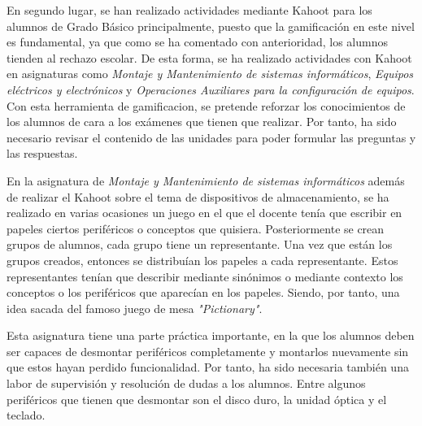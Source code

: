 \documentclass[spanish,12pt, a4paper,twoside]{paper}
\begin{document}
En segundo lugar, se han realizado actividades mediante Kahoot para los alumnos de Grado Básico principalmente, puesto que la gamificación en este nivel es fundamental, ya que como se ha comentado con anterioridad, los alumnos tienden al rechazo escolar. De esta forma, se ha realizado actividades con Kahoot en asignaturas como \textit{Montaje y Mantenimiento de sistemas informáticos}, \textit{Equipos eléctricos y electrónicos} y \textit{Operaciones Auxiliares para la configuración de equipos}. Con esta herramienta de gamificacion, se pretende reforzar los conocimientos de los alumnos de cara a los exámenes que tienen que realizar. Por tanto, ha sido necesario revisar el contenido de las unidades para poder formular las preguntas y las respuestas.

En la asignatura de \textit{Montaje y Mantenimiento de sistemas informáticos} además de realizar el Kahoot sobre el tema de dispositivos de almacenamiento, se ha realizado en varias ocasiones un juego en el que el docente tenía que escribir en papeles ciertos periféricos o conceptos que quisiera. Posteriormente se crean grupos de alumnos, cada grupo tiene un representante. Una vez que están los grupos creados, entonces se distribuían los papeles a cada representante. Estos representantes tenían que describir mediante sinónimos o mediante contexto los conceptos o los periféricos que aparecían en los papeles. Siendo, por tanto, una idea sacada del famoso juego de mesa \textit{"Pictionary"}.

Esta asignatura tiene una parte práctica importante, en la que los alumnos deben ser capaces de desmontar periféricos completamente y montarlos nuevamente sin que estos hayan perdido funcionalidad. Por tanto, ha sido necesaria también una labor de supervisión y resolución de dudas a los alumnos. Entre algunos periféricos que tienen que desmontar son el disco duro, la unidad óptica y el teclado.
\end{document}
